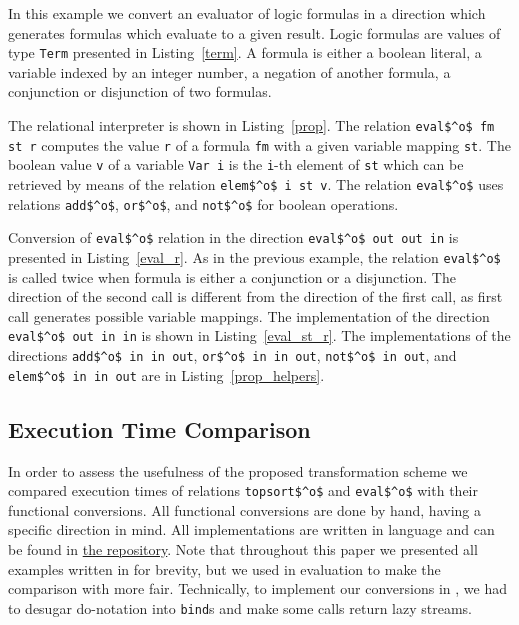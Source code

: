 In this example we convert an evaluator of logic formulas in a direction which generates formulas which evaluate to a given result.
Logic formulas are values of type \lstinline{Term} presented in Listing~\ref{term}.
A formula is either a boolean literal, a variable indexed by an integer number, a negation of another formula, a conjunction or disjunction of two formulas.

The relational interpreter is shown in Listing~\ref{prop}.
The relation \lstinline{eval$^o$ fm st r} computes the value \lstinline{r} of a formula \lstinline{fm} with a given variable mapping \lstinline{st}.
The boolean value \lstinline{v} of a variable \lstinline{Var i} is the \lstinline{i}-th element of \lstinline{st} which can be retrieved by means of the relation \lstinline{elem$^o$ i st v}.
The relation \lstinline{eval$^o$} uses relations \lstinline{add$^o$}, \lstinline{or$^o$}, and \lstinline{not$^o$} for boolean operations.

Conversion of \lstinline{eval$^o$} relation in the direction \lstinline[breaklines=true]{eval$^o$ out out in} is presented in Listing~\ref{eval_r}.
As in the previous example, the relation \lstinline{eval$^o$} is called twice when formula is either a conjunction or a disjunction.
The direction of the second call is different from the direction of the first call, as first call generates possible variable mappings.
The implementation of the direction \lstinline{eval$^o$ out in in} is shown in Listing~\ref{eval_st_r}.
The implementations of the directions \lstinline{add$^o$ in in out}, \lstinline{or$^o$ in in out}, \lstinline{not$^o$ in out}, and \lstinline{elem$^o$ in in out} are in Listing~\ref{prop_helpers}.


\subsection{Execution Time Comparison}

In order to assess the usefulness of the proposed transformation scheme we compared execution times of \mk relations \lstinline{topsort$^o$} and \lstinline{eval$^o$} with their functional conversions.
All functional conversions are done by hand, having a specific direction in mind.
All implementations are written in \ocaml language and can be found in \href{https://github.com/kajigor/miniKanren-func/tree/f7a3ab72fe1a945a650a443627be35093d7224a0}{the repository}.
Note that throughout this paper we presented all examples written in \haskell for brevity, but we used \ocaml in evaluation to make the comparison with \ocanren more fair.
Technically, to implement our conversions in \ocaml, we had to desugar \haskell do-notation into \lstinline{bind}s and make some calls return lazy streams.


